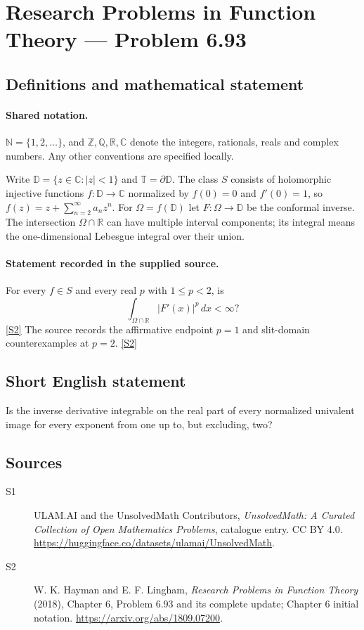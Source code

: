 \documentclass[11pt]{article}
\newcommand{\sref}[2]{\hyperlink{source:#1:#2}{[S#2]}}
\begin{document}
\section{Research Problems in Function Theory — Problem 6.93}\label{statement}

\subsection{Definitions and mathematical statement}

\paragraph{Shared notation.}$\mathbb N=\{1,2,\ldots\}$, and $\mathbb Z,\mathbb Q,\mathbb R,\mathbb C$ denote the integers, rationals, reals and complex numbers. Any other conventions are specified locally.


Write $\mathbb D=\{z\in\mathbb C:|z|<1\}$ and $\mathbb T=\partial\mathbb D$. The class $S$ consists of holomorphic injective functions $f:\mathbb D\to\mathbb C$ normalized by $f(0)=0$ and $f'(0)=1$, so $f(z)=z+\sum_{n=2}^{\infty}a_nz^n$. For $\Omega=f(\mathbb D)$ let $F:\Omega\to\mathbb D$ be the conformal inverse. The intersection $\Omega\cap\mathbb R$ can have multiple interval components; its integral means the one-dimensional Lebesgue integral over their union.
\paragraph{Statement recorded in the supplied source.}
For every $f\in S$ and every real $p$ with $1\le p<2$, is \[\int_{\Omega\cap\mathbb R}|F'(x)|^p\,dx<\infty?\] \sref{statement}{2}
The source records the affirmative endpoint $p=1$ and slit-domain counterexamples at $p=2$. \sref{statement}{2}
\subsection{Short English statement}
Is the inverse derivative integrable on the real part of every normalized univalent image for every exponent from one up to, but excluding, two?
\subsection{Sources}
\begin{description}
\item[\hypertarget{source:statement:1}{S1}] ULAM.AI and the UnsolvedMath Contributors, \emph{UnsolvedMath: A Curated Collection of Open Mathematics Problems}, catalogue entry. CC BY 4.0. \url{https://huggingface.co/datasets/ulamai/UnsolvedMath}.
\item[\hypertarget{source:statement:2}{S2}] W. K. Hayman and E. F. Lingham, \emph{Research Problems in Function Theory} (2018), Chapter 6, Problem 6.93 and its complete update; Chapter 6 initial notation. \url{https://arxiv.org/abs/1809.07200}.
\end{description}
\label{end:statement}
\end{document}
